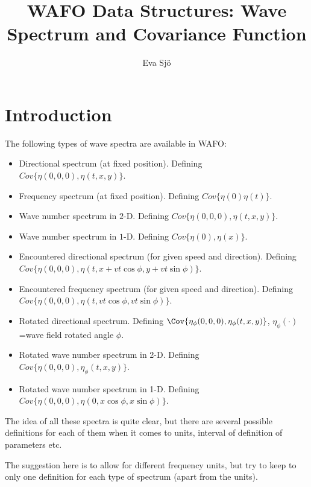 \documentclass{article}
\title{WAFO Data Structures: Wave Spectrum and Covariance Function}
\author{ Eva Sj\"o}
\begin{document}
\maketitle

\section{Introduction}
The following types of wave spectra are available in WAFO:
\begin{itemize}
\item Directional spectrum (at fixed position). Defining $Cov\lbrace {\eta}(0,0,0),{\eta}(t,x,y)\rbrace$.\\
\item Frequency spectrum (at fixed position). Defining $Cov\lbrace {\eta}(0){\eta}(t)\rbrace$.\\
\item Wave number spectrum in $2$-D. Defining $Cov\lbrace {\eta}(0,0,0),{\eta}(t,x,y)\rbrace$.\\
\item Wave number spectrum in $1$-D. Defining $Cov\lbrace{\eta}(0),{\eta}(x)\rbrace$.\\
\item Encountered directional spectrum (for given speed and
  direction). Defining $Cov\lbrace {\eta}(0,0,0), {\eta}(t,x+vt\cos{\phi},y+vt\sin{\phi})\rbrace$. \\
\item Encountered frequency spectrum (for given speed and
  direction). Defining $Cov\lbrace {\eta}(0,0,0), {\eta}(t,vt\cos{\phi},vt\sin{\phi})\rbrace$.\\
\item Rotated directional spectrum. Defining $\Cov
  \lbrace{\eta}_{\phi}(0,0,0),{\eta}_{\phi}(t,x,y)\rbrace$, ${\eta}_{\phi}(\cdot)$=wave field
  rotated angle ${\phi}$.\\
\item Rotated wave number spectrum in 2-D. Defining
  $Cov\lbrace{\eta}(0,0,0),{\eta}_{\phi}(t,x,y)\rbrace$.\\
\item Rotated wave number spectrum in 1-D. Defining
  $Cov\lbrace{\eta}(0,0,0),{\eta}(0,x\cos{\phi},x\sin{\phi})\rbrace$.
\end{itemize}

The idea of all these spectra is quite clear, but there are several possible
definitions for each of them when it comes to units, interval of
definition of parameters etc.

The suggestion here is to allow for different frequency units, but try to keep to only one definition
for each type of spectrum (apart from the units).
\end{document}
